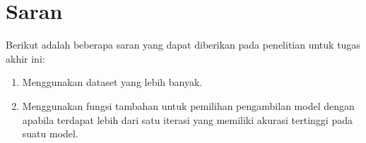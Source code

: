 \section{Saran}
\label{chap:saran}

Berikut adalah beberapa saran yang dapat diberikan pada penelitian untuk tugas akhir ini:

\begin{enumerate}[nolistsep]
	
\item Menggunakan dataset yang lebih banyak.
\item Menggunakan fungsi tambahan untuk pemilihan pengambilan model dengan apabila terdapat lebih dari satu iterasi yang memiliki akurasi tertinggi pada suatu model.

\end{enumerate}
